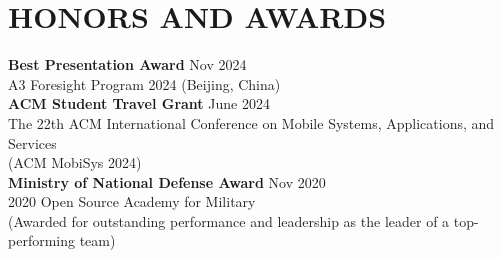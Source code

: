 \section*{HONORS AND AWARDS}

\noindent
\textbf{Best Presentation Award} \hfill Nov 2024 \\
A3 Foresight Program 2024 (Beijing, China) \\

\noindent
\textbf{ACM Student Travel Grant} \hfill June 2024 \\
The 22th ACM International Conference on Mobile Systems, Applications, and Services \\
(ACM MobiSys 2024) \\

\noindent
\textbf{Ministry of National Defense Award} \hfill Nov 2020 \\
2020 Open Source Academy for Military \\
(Awarded for outstanding performance and leadership as the leader of a top-performing team) \\